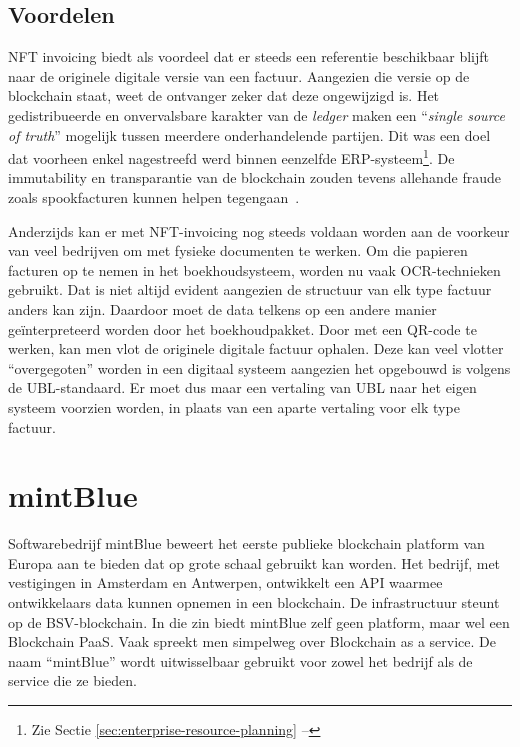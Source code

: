 \subsection{Voordelen}
\label{sub:voordelen}

NFT invoicing biedt als voordeel dat er steeds een referentie beschikbaar blijft naar de originele digitale versie van een factuur. Aangezien die versie op de blockchain staat, weet de ontvanger zeker dat deze ongewijzigd is. Het gedistribueerde en onvervalsbare karakter van de \textit{ledger} maken een ``\textit{single source of truth}'' mogelijk tussen meerdere onderhandelende partijen. Dit was een doel dat voorheen enkel nagestreefd werd binnen eenzelfde ERP-systeem\footnote{Zie Sectie \ref{sec:enterprise-resource-planning} -- }. De immutability en transparantie van de blockchain zouden tevens allehande fraude zoals spookfacturen kunnen helpen tegengaan~\autocite{Sterk2021}. 

Anderzijds kan er met NFT-invoicing nog steeds voldaan worden aan de voorkeur van veel bedrijven om met fysieke documenten te werken. Om die papieren facturen op te nemen in het boekhoudsysteem, worden nu vaak OCR-technieken gebruikt. Dat is niet altijd evident aangezien de structuur van elk type factuur anders kan zijn. Daardoor moet de data telkens op een andere manier geïnterpreteerd worden door het boekhoudpakket. Door met een QR-code te werken, kan men vlot de originele digitale factuur ophalen. Deze kan veel vlotter ``overgegoten'' worden in een digitaal systeem aangezien het opgebouwd is volgens de UBL-standaard. Er moet dus maar een vertaling van UBL naar het eigen systeem voorzien worden, in plaats van een aparte vertaling voor elk type factuur.

\section{mintBlue}
\label{sec:mintBlue}

Softwarebedrijf mintBlue beweert het eerste publieke blockchain platform van Europa aan te bieden dat op grote schaal gebruikt kan worden. Het bedrijf, met vestigingen in Amsterdam en Antwerpen, ontwikkelt een API waarmee ontwikkelaars data kunnen opnemen in een blockchain. De infrastructuur steunt op de BSV-blockchain. In die zin biedt mintBlue zelf geen platform, maar wel een Blockchain PaaS. Vaak spreekt men simpelweg over Blockchain as a service. De naam ``mintBlue'' wordt uitwisselbaar gebruikt voor zowel het bedrijf als de service die ze bieden.

